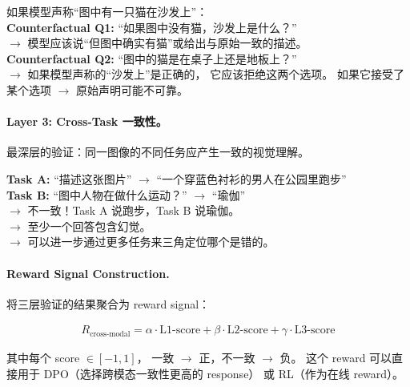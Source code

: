 \documentclass[12pt,a4paper]{article}
\begin{document}
\begin{tcolorbox}[colback=gray!5,colframe=gray!50,boxrule=0.3pt,left=4pt,right=4pt]
\small
如果模型声称``图中有一只猫在沙发上''：\\[2pt]
\textbf{Counterfactual Q1:}
``如果图中没有猫，沙发上是什么？''\\
$\rightarrow$ 模型应该说``但图中确实有猫''或给出与原始一致的描述。\\[2pt]
\textbf{Counterfactual Q2:}
``图中的猫是在桌子上还是地板上？''\\
$\rightarrow$ 如果模型声称的``沙发上''是正确的，
它应该拒绝这两个选项。
如果它接受了某个选项 $\rightarrow$ 原始声明可能不可靠。
\end{tcolorbox}

\paragraph{Layer 3: Cross-Task 一致性。}

最深层的验证：同一图像的不同任务应产生一致的视觉理解。

\begin{tcolorbox}[colback=gray!5,colframe=gray!50,boxrule=0.3pt,left=4pt,right=4pt]
\small
\textbf{Task A:} ``描述这张图片''
$\rightarrow$ ``一个穿蓝色衬衫的男人在公园里跑步''\\[2pt]
\textbf{Task B:} ``图中人物在做什么运动？'' $\rightarrow$ ``瑜伽''\\[2pt]
$\rightarrow$ 不一致！Task A 说跑步，Task B 说瑜伽。\\
$\rightarrow$ 至少一个回答包含幻觉。\\
$\rightarrow$ 可以进一步通过更多任务来三角定位哪个是错的。
\end{tcolorbox}

\paragraph{Reward Signal Construction.}

将三层验证的结果聚合为 reward signal：

\begin{align}
R_{\text{cross-modal}} = \alpha \cdot \text{L1-score} + \beta \cdot \text{L2-score} + \gamma \cdot \text{L3-score}
\end{align}

\noindent
其中每个 score $\in [-1, 1]$，
一致 $\rightarrow$ 正，不一致 $\rightarrow$ 负。
这个 reward 可以直接用于 DPO（选择跨模态一致性更高的 response）
或 RL（作为在线 reward）。
\end{document}

